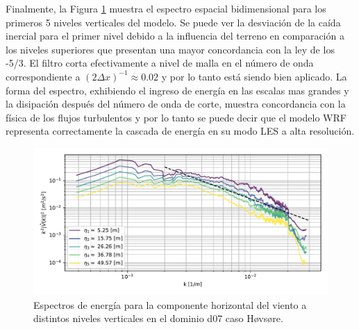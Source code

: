 Finalmente, la Figura \ref{fig:06_hov_spectrum} muestra el espectro espacial bidimensional para los primeros 5 niveles verticales del modelo. Se puede ver la desviación de la caída inercial para el primer nivel debido a la influencia del terreno en comparación a los niveles superiores que presentan una mayor concordancia con la ley de los -5/3. El filtro corta efectivamente a nivel de malla en el número de onda correspondiente a $(2\Delta x)^{-1}\approx 0.02$ y por lo tanto está siendo bien aplicado. La forma del espectro, exhibiendo el ingreso de energía en las escalas mas grandes y la disipación después del número de onda de corte, muestra concordancia con la física de los flujos turbulentos y por lo tanto se puede decir que el modelo WRF representa correctamente la cascada de energía en su modo LES a alta resolución.
\begin{figure}[H]
	\centering
	\includegraphics[width=1.0\linewidth,page=1,trim={3mm 5mm 3mm 3mm},clip]{Imagenes/06/hov/spectra}%
	\caption{Espectros de energía para la componente horizontal del viento a distintos niveles verticales en el dominio d07 caso Høvsøre.}
	\label{fig:06_hov_spectrum}
\end{figure}


